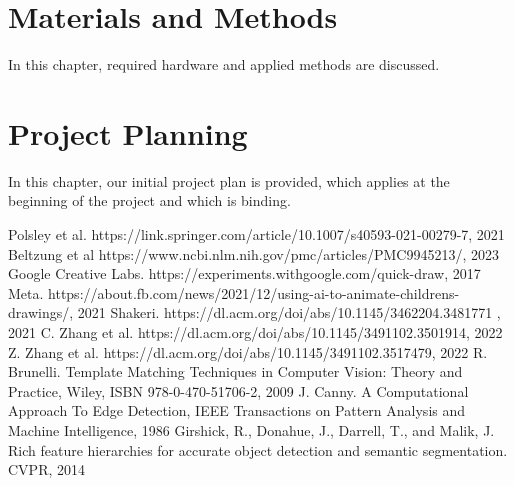 \documentclass[11pt,a4paper,titlepage,final,table]{article}
\begin{document}
\section{Materials and Methods}
In this chapter, required hardware and applied methods are discussed.



\section{Project Planning}
In this chapter, our initial project plan is provided, which applies at the beginning of the project and which is binding.




\newpage

\begin{thebibliography}{2}
Polsley et al. https://link.springer.com/article/10.1007/s40593-021-00279-7, 2021
Beltzung et al https://www.ncbi.nlm.nih.gov/pmc/articles/PMC9945213/, 2023
Google Creative Labs. https://experiments.withgoogle.com/quick-draw, 2017
Meta. https://about.fb.com/news/2021/12/using-ai-to-animate-childrens-drawings/, 2021
Shakeri. https://dl.acm.org/doi/abs/10.1145/3462204.3481771 , 2021
C. Zhang et al. https://dl.acm.org/doi/abs/10.1145/3491102.3501914, 2022
Z. Zhang et al. https://dl.acm.org/doi/abs/10.1145/3491102.3517479, 2022
R. Brunelli. Template Matching Techniques in Computer Vision: Theory and Practice, Wiley, ISBN 978-0-470-51706-2, 2009
J. Canny. A Computational Approach To Edge Detection, IEEE Transactions on Pattern Analysis and Machine Intelligence, 1986
Girshick, R., Donahue, J., Darrell, T., and Malik, J. Rich feature hierarchies
for accurate object detection and semantic segmentation. CVPR, 2014
\end{thebibliography}
\end{document}
